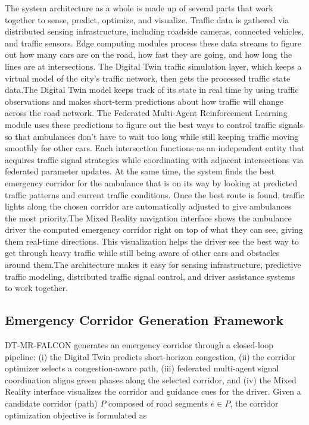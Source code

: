 \documentclass[conference]{IEEEtran}
\begin{document}
The system architecture as a whole is made up of several parts that work together to sense, predict, optimize, and visualize. Traffic data is gathered via distributed sensing infrastructure, including roadside cameras, connected vehicles, and traffic sensors. Edge computing modules process these data streams to figure out how many cars are on the road, how fast they are going, and how long the lines are at intersections. The Digital Twin traffic simulation layer, which keeps a virtual model of the city's traffic network, then gets the processed traffic state data.The Digital Twin model keeps track of its state in real time by using traffic observations and makes short-term predictions about how traffic will change across the road network. The Federated Multi-Agent Reinforcement Learning module uses these predictions to figure out the best ways to control traffic signals so that ambulances don't have to wait too long while still keeping traffic moving smoothly for other cars. Each intersection functions as an independent entity that acquires traffic signal strategies while coordinating with adjacent intersections via federated parameter updates.
At the same time, the system finds the best emergency corridor for the ambulance that is on its way by looking at predicted traffic patterns and current traffic conditions. Once the best route is found, traffic lights along the chosen corridor are automatically adjusted to give ambulances the most priority.The Mixed Reality navigation interface shows the ambulance driver the computed emergency corridor right on top of what they can see, giving them real-time directions. This visualization helps the driver see the best way to get through heavy traffic while still being aware of other cars and obstacles around them.The architecture makes it easy for sensing infrastructure, predictive traffic modeling, distributed traffic signal control, and driver assistance systems to work together.

\subsection{Emergency Corridor Generation Framework}
DT-MR-FALCON generates an emergency corridor through a closed-loop pipeline: (i) the Digital Twin predicts short-horizon congestion, (ii) the corridor optimizer selects a congestion-aware path, (iii) federated multi-agent signal coordination aligns green phases along the selected corridor, and (iv) the Mixed Reality interface visualizes the corridor and guidance cues for the driver.
Given a candidate corridor (path) $P$ composed of road segments $e \in P$, the corridor optimization objective is formulated as
\end{document}
